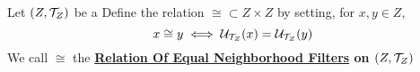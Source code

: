 \label{def:RelationOfEqualNeighborhoodFilters}
\newcommand{\RelationOfEqualNeighborhoodFilters}[1]{
    \bf \hyperref[def:RelationOfEqualNeighborhoodFilters]{Relation Of Equal Neighborhood Filters} \rm on #1
}
\begin{df}
    Let $(Z, \mathcal{T}_Z)$ be a \TopologicalSpace
	Define the relation 
	$\cong \subset Z \times Z$ 
	by setting, for $x,y \in Z$, 
    \begin{equation}
        x \cong y \iff \mathcal{U}_{\mathcal{T}_Z}(x)=\mathcal{U}_{\mathcal{T}_Z}(y)
    \end{equation}
    We call $\cong$ the \RelationOfEqualNeighborhoodFilters{$(Z,\mathcal{T}_Z)$}
\end{df} 
